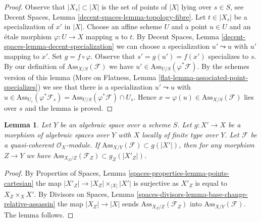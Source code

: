 \documentclass{stacks-project}
\theoremstyle{plain}
\newtheorem{lemma}[subsection]{Lemma}
\theoremstyle{definition}
\theoremstyle{remark}
\numberwithin{equation}{subsection}
\begin{document}
\begin{proof}
Observe that $|X_s| \subset |X|$ is the set of points of $|X|$
lying over $s \in S$, see
Decent Spaces, Lemma \ref{decent-spaces-lemma-topology-fibre}.
Let $t \in |X_s|$ be a specialization of $x'$ in $|X|$.
Choose an affine scheme $U$ and a point $u \in U$ and
an \'etale morphism $\varphi : U \to X$ mapping $u$ to $t$.
By Decent Spaces, Lemma \ref{decent-spaces-lemma-decent-specialization}
we can choose a specialization $u' \leadsto u$
with $u'$ mapping to $x'$. Set $g = f \circ \varphi$.
Observe that $s' = g(u') = f(x')$ specializes to $s$.
By our definition of $\text{Ass}_{X/S}(\mathcal{F})$
we have $u' \in \text{Ass}_{U/S}(\varphi^*\mathcal{F})$.
By the schemes version of this lemma
(More on Flatness, Lemma \ref{flat-lemma-associated-point-specializes})
we see that there is a specialization $u' \leadsto u$ with
$u \in \text{Ass}_{U_s}(\varphi^*\mathcal{F}_s) =
\text{Ass}_{U/S}(\varphi^*\mathcal{F}) \cap U_s$.
Hence $x = \varphi(u) \in \text{Ass}_{X/S}(\mathcal{F})$
lies over $s$ and the lemma is proved.
\end{proof}

\begin{lemma}
\label{lemma-contains-relative-ass-after-base-change}
Let $Y$ be an algebraic space over a scheme $S$. Let $g : X' \to X$ be a
morphism of algebraic spaces over $Y$ with $X$ locally of finite type over $Y$.
Let $\mathcal{F}$ be a quasi-coherent $\mathcal{O}_X$-module.
If $\text{Ass}_{X/Y}(\mathcal{F}) \subset g(|X'|)$, then for any morphism
$Z \to Y$ we have $\text{Ass}_{X_Z/Z}(\mathcal{F}_Z) \subset g_Z(|X'_Z|)$.
\end{lemma}

\begin{proof}
By Properties of Spaces, Lemma \ref{spaces-properties-lemma-points-cartesian}
the map $|X'_Z| \to |X_Z| \times_{|X|} |X'|$ is surjective as
$X'_Z$ is equal to $X_Z \times_X X'$.
By Divisors on Spaces, Lemma
\ref{spaces-divisors-lemma-base-change-relative-assassin}
the map $|X_Z| \to |X|$ sends $\text{Ass}_{X_Z/Z}(\mathcal{F}_Z)$
into $\text{Ass}_{X/Y}(\mathcal{F})$. The lemma follows.
\end{proof}
\end{document}
